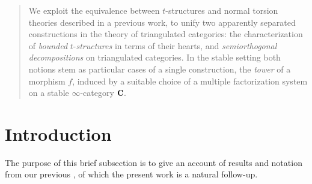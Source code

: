 \begin{abstract}
We exploit the equivalence between $t$-structures and normal torsion theories described in a previous work, to unify two apparently separated constructions in the theory of triangulated categories: the characterization of \emph{bounded} $t$-\emph{structures} in terms of their hearts, and \emph{semiorthogonal decompositions} on triangulated categories. In the stable setting both notions stem as particular cases of a single construction, the \emph{tower} of a morphism $f$, induced by a suitable choice of a multiple factorization system on a stable $\infty$-category $\C$. 
\end{abstract}
\section{Introduction}
The purpose of this brief subsection is to give an account of results and notation from our previous \cite{Fiorenza2014}, of which the present work is a natural follow-up. 

